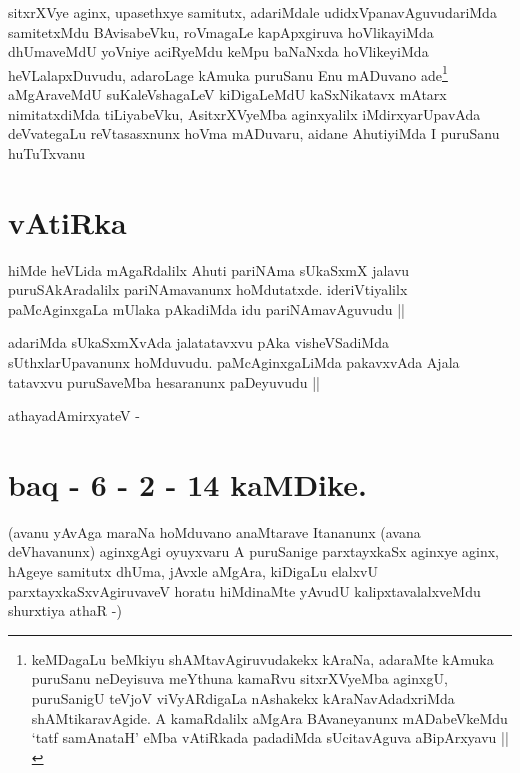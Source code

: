 \begin{artha}
sitxrXVye aginx, upasethxye samitutx, adariMdale
udidxVpanavAguvudariMda samitetxMdu BAvisabeVku, roVmagaLe
kapApxgiruva hoVlikayiMda dhUmaveMdU yoVniye aciRyeMdu keMpu baNaNxda
hoVlikeyiMda heVLalapxDuvudu, adaroLage kAmuka puruSanu Enu mADuvano
ade\footnote{keMDagaLu beMkiyu shAMtavAgiruvudakekx kAraNa, adaraMte
  kAmuka puruSanu neDeyisuva meYthuna kamaRvu sitxrXVyeMba aginxgU,
  puruSanigU teVjoV viVyARdigaLa nAshakekx kAraNavAdadxriMda
  shAMtikaravAgide. A kamaRdalilx aMgAra BAvaneyanunx mADabeVkeMdu
  `tatf samAnataH' eMba vAtiRkada padadiMda sUcitavAguva aBipArxyavu ||} aMgAraveMdU suKaleVshagaLeV kiDigaLeMdU kaSxNikatavx
mAtarx nimitatxdiMda tiLiyabeVku, AsitxrXVyeMba aginxyalilx
iMdirxyarUpavAda deVvategaLu reVtasasxnunx hoVma mADuvaru, aidane
AhutiyiMda I puruSanu huTuTxvanu 
\end{artha}

\section*{vAtiRka}

\begin{artha}
hiMde heVLida mAgaRdalilx Ahuti pariNAma sUkaSxmX jalavu
puruSAkAradalilx pariNAmavanunx hoMdutatxde. ideriVtiyalilx
paMcAginxgaLa mUlaka pAkadiMda idu pariNAmavAguvudu ||
\end{artha}


\begin{artha}
adariMda sUkaSxmXvAda jalatatavxvu pAka visheVSadiMda
sUthxlarUpavanunx hoMduvudu. paMcAginxgaLiMda pakavxvAda Ajala
tatavxvu puruSaveMba hesaranunx paDeyuvudu ||
\end{artha}


 athayadAmirxyateV -

\section*{baq - 6 - 2 - 14 kaMDike.}

\stext

\begin{artha}
(avanu yAvAga maraNa hoMduvano anaMtarave Itananunx (avana
  deVhavanunx) aginxgAgi oyuyxvaru A puruSanige parxtayxkaSx aginxye
  aginx, hAgeye samitutx dhUma, jAvxle aMgAra, kiDigaLu elalxvU
  parxtayxkaSxvAgiruvaveV horatu hiMdinaMte yAvudU kalipxtavalalxveMdu
  shurxtiya athaR -)
\end{artha}

